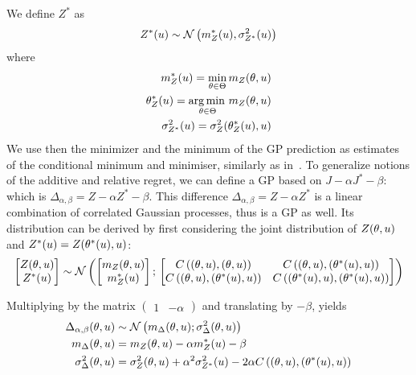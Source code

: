 \documentclass[../../Main_ManuscritThese.tex]{subfiles}
\begin{document}
We define $Z^*$ as
\begin{equation}
  Z^*(u) \sim \mathcal{N}\left(m^*_Z(u), \sigma^{2}_{Z^*}(u)\right)
\end{equation}
where
\begin{align}
  m^*_Z(u) = \min_{\theta\in\Theta} m_Z(\theta,u) \\
  \theta_Z^*(u)=\operatorname*{arg\,min \,}_{\theta\in\Theta} m_Z(\theta, u) \\
  \sigma^{2}_{Z^*}(u) = \sigma^{2}_Z(\theta^*_Z(u), u) 
\end{align}
We use then the minimizer and the minimum of the GP prediction as estimates of the conditional minimum and minimiser, similarly as in~\cite{ginsbourger_bayesian_2014}. %
To generalize notions of the additive and relative regret, we can define a GP based on $J - \alpha J^* - \beta$: which is $\Delta_{\alpha, \beta} = Z - \alpha Z^* - \beta$.
This difference $\Delta_{\alpha,\beta} = Z - \alpha Z^*$ is a linear combination of correlated Gaussian processes, thus is a GP as well.
Its distribution can be derived by first considering the joint distribution of $Z(\theta,u)$ and $Z^*(u) = Z(\theta^*(u), u)$:
\begin{equation}
  \begin{bmatrix}
    Z(\theta,u) \\
    Z^*(u)
  \end{bmatrix}
  \sim \mathcal{N}\left(
    \begin{bmatrix}
      m_Z(\theta,u) \\
      m_Z^*(u)
    \end{bmatrix}
    ;\,
    \begin{bmatrix}
      C\left((\theta,u),(\theta,u)\right) & C\left((\theta,u),(\theta^*(u),u)\right) \\
      C\left((\theta,u),(\theta^*(u),u)\right) & C\left((\theta^*(u),u),(\theta^*(u),u)\right)
    \end{bmatrix}
\right)
\end{equation}

Multiplying by the matrix $\begin{pmatrix}1 & -\alpha \end{pmatrix}$ and translating by $-\beta$, yields
\begin{align}
  \Delta_{\alpha,\beta}(\theta,u) &\sim \mathcal{N}\left(m_{\Delta}(\theta,u); \sigma^2_{\Delta}(\theta,u)\right)  \label{eq:delta_GP_ab}\\
  m_{\Delta}(\theta,u) &= m_Z(\theta,u) - \alpha m_Z^*(u) - \beta \label{eq:mu_delta_GP_ab}\\
  \sigma^2_{\Delta}(\theta,u) &= \sigma_Z^2(\theta,u) + \alpha^2 \sigma_{Z^*}^2(u) - 2\alpha C\left((\theta,u),(\theta^*(u),u)\right) \label{eq:variance_delta_GP_ab}
\end{align}
\end{document}
